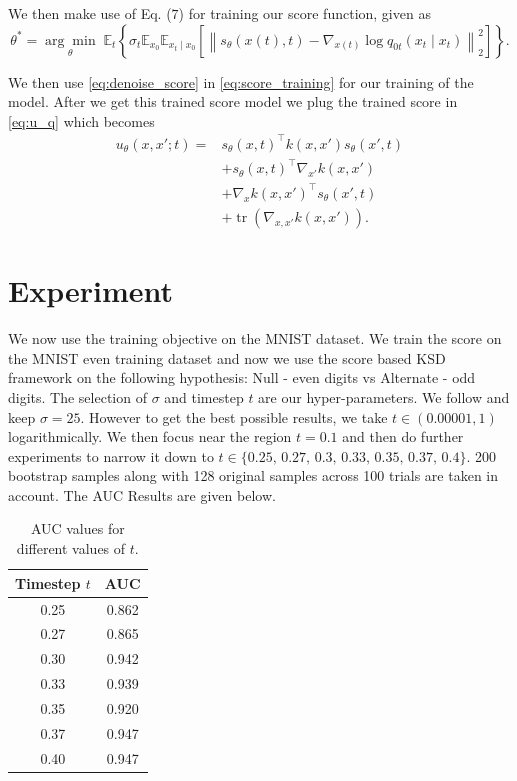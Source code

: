 \documentclass[12pt,a4paper]{report}
\begin{document}
\noindent
We then make use of Eq. ($7$) \cite{song2021scorebasedgenerativemodelingstochastic} for training our score function, given as 
\begin{equation}
\theta^*
=
\underset{\theta}{\arg\min}\;
\mathbb{E}_t
\left\{
\sigma_t
\mathbb{E}_{x_0}
\mathbb{E}_{x_t\mid x_0}
\left[
\left\|
s_{\theta}(x(t),t)
-
\nabla_{x(t)}
\log q_{0t}(x_t\mid x_t)
\right\|_2^2
\right]
\right\}.
\label{eq:score_training}
\end{equation}

\noindent
We then use \ref{eq:denoise_score} in \ref{eq:score_training} for our training of the model. After we get this trained score model we plug the trained score in \ref{eq:u_q} which becomes
\begin{equation}
\begin{aligned}
u_{\theta}(x,x';t)
={}& s_{\theta}(x,t)^\top k(x,x')s_{\theta}(x',t) \\
&+ s_{\theta}(x,t)^\top \nabla_{x'} k(x,x') \\
&+ \nabla_x k(x,x')^\top s_{\theta}(x',t) \\
&+ \operatorname{tr}\left(\nabla_{x,x'} k(x,x')\right).
\end{aligned}
\end{equation}

\section{Experiment}
We now use the training objective on the MNIST dataset. We train the score on the MNIST even training dataset and now we use the score based KSD framework on the following hypothesis: Null - even digits vs Alternate - odd digits. The selection of $\sigma$ and timestep $t$ are our hyper-parameters. We follow \cite{song2021scorebasedgenerativemodelingstochastic} and keep $\sigma = 25$. However to get the best possible results, we take $t \in (0.00001, 1)$ logarithmically. We then focus near the region $t=0.1$ and then do further experiments to narrow it down to $t \in \{0.25,\,0.27,\,0.3,\,0.33,\,0.35,\,0.37,\,0.4\}$. 200 bootstrap samples along with 128 original samples across 100 trials are taken in account. The AUC Results are given below.
\begin{table}[ht]
    \centering
    \caption{AUC values for different values of $t$.}
    \label{tab:auc_t}
    \begin{tabular}{cc}
        \hline
        Timestep $t$ & AUC \\
        \hline
        0.25 & 0.862 \\
        0.27 & 0.865 \\
        0.30 & 0.942 \\
        0.33 & 0.939 \\
        0.35 & 0.920 \\
        0.37 & 0.947 \\
        0.40 & 0.947 \\
        \hline
    \end{tabular}
\end{table}
\end{document}
